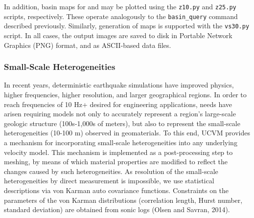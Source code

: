In addition, basin maps for  and  may be plotted using the \texttt{z10.py} and \texttt{z25.py} scripts, respectively. These operate analogously to the \texttt{basin\_query} command described previously. Similarly, generation of \vsthirty{} maps is supported with the \texttt{vs30.py} script. In all cases, the output images are saved to disk in Portable Network Graphics (PNG) format, and as ASCII-based data files.

\subsubsection{Small-Scale Heterogeneities}

In recent years, deterministic earthquake simulations have improved physics, higher frequencies, higher resolution, and larger geographical regions. In order to reach frequencies of 10 Hz+ desired for engineering applications, needs have arisen requiring models not only to accurately represent a region's large-scale geologic structure (100s-1,000s of meters), but also to represent the small-scale heterogeneities (10-100 m) observed in geomaterials. To this end, UCVM provides a mechanism for incorporating small-scale heterogeneities into any underlying velocity model. This mechanism is implemented as a post-processing step to meshing, by means of which material properties are modified to reflect the changes caused by such heterogeneities. As resolution of the small-scale heterogeneities by direct measurement is impossible, we use statistical descriptions via von Karman auto covariance functions. Constraints on the parameters of the von Karman distributions (correlation length, Hurst number, standard deviation) are obtained from sonic logs (Olsen and Savran, 2014).


